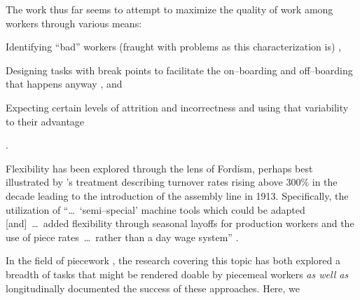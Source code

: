 \documentclass[trackingWork]{subfiles}
\begin{document}
{    The work thus far seems to attempt to maximize the quality of work among workers through various means:
    \begin{inlinelist}
      \item Identifying ``bad'' workers (fraught with problems as this characterization is) \cite{MaliciousCrowdworkersGadiraju}%
,       \item Designing tasks with break points to facilitate the on--boarding and off--boarding that happens anyway \cite{cheng2015break}, and
      \item Expecting certain levels of attrition and incorrectness and using that variability to their advantage \cite{embracingErrorKrishna}
    \end{inlinelist}.


    Flexibility has been explored through the lens of Fordism, perhaps best illustrated by
    \citeauthor{tolliday1986between}'s treatment describing
    turnover rates rising above 300\% in the decade leading to the introduction of the assembly line in 1913.
    Specifically, the utilization of ``\dots~`semi--special' machine tools which could be adapted
    [and]~\dots~added flexibility through seasonal layoffs for production workers and the use of
    piece rates~\dots~rather than a day wage system''
    \cite{tolliday1986between}.

    In the field of piecework%
,     the research covering this topic has both explored
    a breadth of tasks that might be rendered doable by piecemeal workers
    \textit{as well as} longitudinally documented the success of these approaches.
    Here, we 
}
\end{document}
